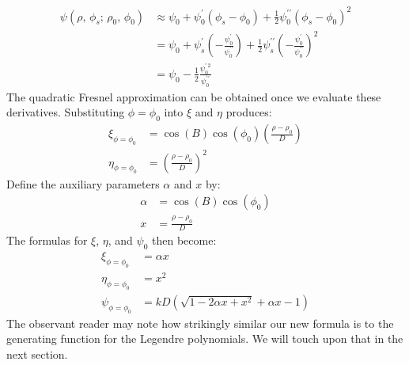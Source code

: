 \documentclass{article}
\begin{document}
        \begin{subequations}
            \begin{align}
                \psi(\rho,\,\phi_{s};\,\rho_{0},\,\phi_{0})
                &\approx\psi_{0}+\psi^{\prime}_{0}(\phi_{s}-\phi_{0})
                    +\frac{1}{2}\psi^{\prime\prime}_{0}(\phi_{s}-\phi_{0})^{2}\\
                &=\psi_{0}+\psi^{\prime}_{s}\left(
                    -\frac{\psi^{\prime}_{0}}{\psi^{\prime\prime}_{0}}
                \right)+
                \frac{1}{2}\psi^{\prime\prime}_{s}\left(
                    -\frac{\psi^{\prime}_{0}}{\psi^{\prime\prime}_{0}}
                \right)^{2}\\
                &=\psi_{0}
                    -\frac{1}{2}
                    \frac{\psi^{\prime\,2}_{0}}{\psi^{\prime\prime}_{0}}
            \end{align}
        \end{subequations}
        The quadratic Fresnel approximation can be obtained once we
        evaluate these derivatives. Substituting $\phi=\phi_{0}$
        into $\xi$ and $\eta$ produces:
        \begin{align}
            \xi_{\phi=\phi_{0}}
            &=\cos(B)\cos(\phi_{0})\left(
                \frac{\rho-\rho_{0}}{D}
            \right)\\
            \eta_{\phi=\phi_{0}}
            &=\left(\frac{\rho-\rho_{0}}{D}\right)^{2}
        \end{align}
        Define the auxiliary parameters $\alpha$ and $x$ by:
        \begin{align}
            \label{eqn:alpha_and_x}
            \alpha&=\cos(B)\cos(\phi_{0})\\
            x&=\frac{\rho-\rho_{0}}{D}
        \end{align}
        The formulas for $\xi$, $\eta$, and $\psi_{0}$ then become:
        \begin{align}
            \xi_{\phi=\phi_{0}}
            &=\alpha{x}\\
            \eta_{\phi=\phi_{0}}
            &=x^{2}\\
            \psi_{\phi=\phi_{0}}
            &=kD\left(
                \sqrt{1-2\alpha{x}+x^{2}}
                +\alpha{x}-1
            \right)
        \end{align}
        The observant reader may note how strikingly similar our new formula is
        to the generating function for the Legendre polynomials. We will
        touch upon that in the next section.
\end{document}
